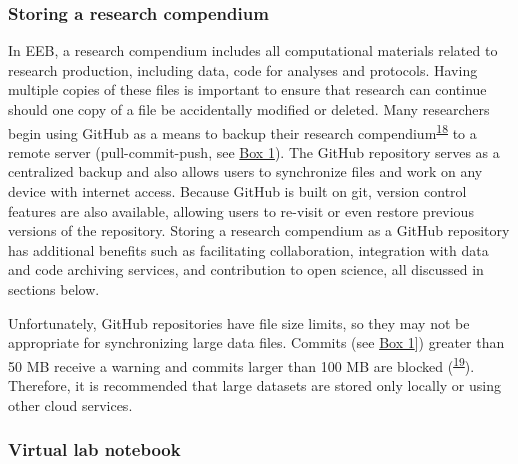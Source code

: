 \hypertarget{storing-a-research-compendium}{%
\subsubsection{Storing a research compendium}\label{storing-a-research-compendium}}

In EEB, a research compendium includes all computational materials related to research production, including data, code for analyses and protocols.
Having multiple copies of these files is important to ensure that research can continue should one copy of a file be accidentally modified or deleted.
Many researchers begin using GitHub as a means to backup their research compendium\textsuperscript{\protect\hyperlink{ref-MwwMapRG}{18}} to a remote server (pull-commit-push, see \protect\hyperlink{definitions}{Box 1}).
The GitHub repository serves as a centralized backup and also allows users to synchronize files and work on any device with internet access.
Because GitHub is built on git, version control features are also available, allowing users to re-visit or even restore previous versions of the repository.
Storing a research compendium as a GitHub repository has additional benefits such as facilitating collaboration, integration with data and code archiving services, and contribution to open science, all discussed in sections below.

Unfortunately, GitHub repositories have file size limits, so they may not be appropriate for synchronizing large data files.
Commits (see \protect\hyperlink{definitions}{Box 1}{]}) greater than 50 MB receive a warning and commits larger than 100 MB are blocked (\textsuperscript{\protect\hyperlink{ref-1Co6ZZjF1}{19}}).
Therefore, it is recommended that large datasets are stored only locally or using other cloud services.

\hypertarget{virtual-lab-notebook}{%
\subsubsection{Virtual lab notebook}\label{virtual-lab-notebook}}

